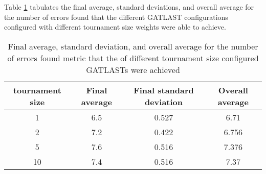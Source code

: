 Table \ref{tab:HP:GA:tournamentSize:number of errors found} tabulates the final average, standard deviations, and overall average for the number of errors found that the different GATLAST configurations configured with different tournament size weights were able to achieve.
\begin{table}[tbh!]
\centering
\begin{adjustbox}{trim=0cm 0cm 0cm 0cm, clip=true}
\begin{tabular}{|c|c|c|c|}
\hline
tournament size & Final average & Final standard deviation & Overall average\\
\hline
1 & 6.5 & 0.527 & 6.71\\\hline
2 & 7.2 & 0.422 & 6.756\\\hline
5 & 7.6 & 0.516 & 7.376\\\hline
10 & 7.4 & 0.516 & 7.37\\\hline
\end{tabular}
\end{adjustbox}
\caption{Final average, standard deviation, and overall average for the number of errors found metric that the of different tournament size configured GATLASTs were achieved}
\label{tab:HP:GA:tournamentSize:number of errors found}
\end{table}